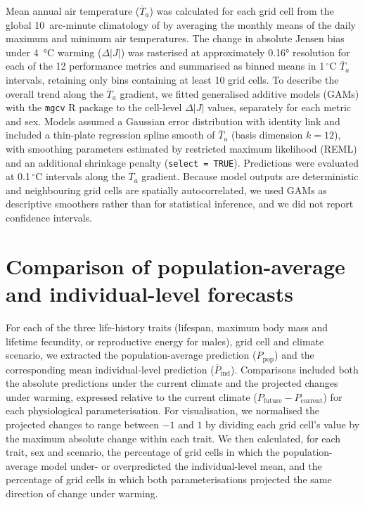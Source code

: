 \documentclass[12pt]{article}
\begin{document}
Mean annual air temperature ($\overline{T}_a$) was calculated for each grid cell from the global 10~arc-minute climatology of \textcite{new2002} by averaging the monthly means of the daily maximum and minimum air temperatures. The change in absolute Jensen bias under \qty{+4}{\celsius} warming ($\Delta|J|$) was rasterised at approximately \ang{0.16} resolution for each of the 12 performance metrics and summarised as binned means in 1\,${}^{\circ}$C $\overline{T}_a$ intervals, retaining only bins containing at least 10 grid cells. To describe the overall trend along the $\overline{T}_a$ gradient, we fitted generalised additive models (GAMs) with the \texttt{mgcv} R package \parencite{R-mgcv} to the cell-level $\Delta|J|$ values, separately for each metric and sex. Models assumed a Gaussian error distribution with identity link and included a thin-plate regression spline smooth of $\overline{T}_a$ (basis dimension $k = 12$), with smoothing parameters estimated by restricted maximum likelihood (REML) and an additional shrinkage penalty (\texttt{select = TRUE}). Predictions were evaluated at 0.1\,${}^{\circ}$C intervals along the $\overline{T}_a$ gradient. Because model outputs are deterministic and neighbouring grid cells are spatially autocorrelated, we used GAMs as descriptive smoothers rather than for statistical inference, and we did not report confidence intervals.

\section{Comparison of population-average and individual-level forecasts}\label{sm:forecasts}

For each of the three life-history traits (lifespan, maximum body mass and lifetime fecundity, or reproductive energy for males), grid cell and climate scenario, we extracted the population-average prediction ($P_{\mathrm{pop}}$) and the corresponding mean individual-level prediction ($\overline{P}_{\mathrm{ind}}$). Comparisons included both the absolute predictions under the current climate and the projected changes under warming, expressed relative to the current climate ($P_{\mathrm{future}} - P_{\mathrm{current}}$) for each physiological parameterisation. For visualisation, we normalised the projected changes to range between $-1$ and $1$ by dividing each grid cell's value by the maximum absolute change within each trait. We then calculated, for each trait, sex and scenario, the percentage of grid cells in which the population-average model under- or overpredicted the individual-level mean, and the percentage of grid cells in which both parameterisations projected the same direction of change under warming.
\end{document}
